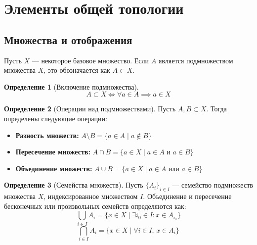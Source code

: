 \documentclass[12pt,a4paper]{article}
\theoremstyle{definition}
\newtheorem{definition}{Определение}[section]
\begin{document}
\section{Элементы общей топологии}
\subsection{Множества и отображения}

Пусть $X$ --- некоторое базовое множество. Если $A$ является подмножеством множества $X$, это обозначается как $A \subset X$.

\begin{definition}[Включение подмножества]
$$A \subset X \iff \forall a \in A \implies a \in X$$
\end{definition}

\begin{definition}[Операции над подмножествами]
Пусть $A, B \subset X$. Тогда определены следующие операции:
\begin{itemize}
    \item \textbf{Разность множеств:} $A \setminus B = \{a \in A \mid a \notin B\}$
    \item \textbf{Пересечение множеств:} $A \cap B = \{a \in X \mid a \in A \text{ и } a \in B\}$
    \item \textbf{Объединение множеств:} $A \cup B = \{a \in X \mid a \in A \text{ или } a \in B\}$
\end{itemize}
\end{definition}

\begin{definition}[Семейства множеств]
Пусть $\{A_i\}_{i \in I}$ --- семейство подмножеств множества $X$, индексированное множеством $I$. 
Объединение и пересечение бесконечных или произвольных семейств определяются как:
$$\bigcup_{i \in I} A_i = \{x \in X \mid \exists i_0 \in I : x \in A_{i_0}\}$$
$$\bigcap_{i \in I} A_i = \{x \in X \mid \forall i \in I, \, x \in A_{i}\}$$
\end{definition}
\end{document}
